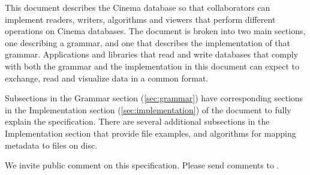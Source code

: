\label{sec:chaplin}

This document describes the Cinema \chaplin database so that collaborators can implement readers, writers, algorithms and viewers that perform different operations on Cinema databases. The document is broken into two main sections, one describing a \chaplin grammar, and one that describes the \chaplin implementation of that grammar. Applications and libraries that read and write databases that comply with both the grammar and the implementation in this document can expect to exchange, read and visualize data in a common format.

Subsections in the Grammar section (\ref{sec:grammar}) have corresponding sections in the Implementation section (\ref{sec:implementation}) of the document to fully explain the specification. There are several additional subsections in the Implementation section that provide file examples, and algorithms for mapping metadata to files on disc.

We invite public comment on this specification. Please send comments to \cdevemail.
